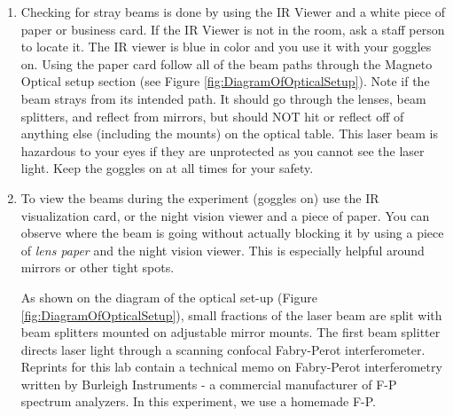 \documentclass{../lab}
\begin{document}
\begin{enumerate}
    \item Checking for stray beams is done by using the IR Viewer and a white piece of paper or business card. If the IR Viewer is not in the room, ask a staff person to locate it. The IR viewer is blue in color and you use it with your goggles on. Using the paper card follow all of the beam paths through the Magneto Optical setup section (see Figure \ref{fig:DiagramOfOpticalSetup}). Note if the beam strays from its intended path. It should go through the lenses, beam splitters, and reflect from mirrors, but should NOT hit or reflect off of anything else (including the mounts) on the optical table. This laser beam is hazardous to your eyes if they are unprotected as you cannot see the laser light. Keep the goggles on at all times for your safety.
    
    \item To view the beams during the experiment (goggles on) use the IR visualization card, or the night vision viewer and a piece of paper. You can observe where the beam is going without actually blocking it by using a piece of \emph{lens paper} and the night vision viewer. This is especially helpful around mirrors or other tight spots.

    

    As shown on the diagram of the optical set-up (Figure \ref{fig:DiagramOfOpticalSetup}), small fractions of the laser beam are split with beam splitters mounted on adjustable mirror mounts. The first beam splitter directs laser light through a scanning confocal Fabry-Perot interferometer. Reprints for this lab contain a technical memo on Fabry-Perot interferometry written by Burleigh Instruments - a commercial manufacturer of F-P spectrum analyzers. In this experiment, we use a homemade F-P.
    

\end{enumerate}
\end{document}

